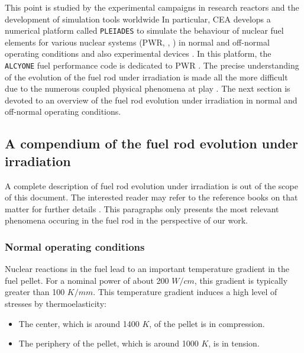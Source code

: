 This point is studied by the experimental campaigns in research reactors
and the development of simulation tools worldwide
\cite{ garcia_mono-dimensional_2002, williamson_multidimensional_2012, di_marcello_transuranus_2014, largenton_cyrano3_2014, petry_cyrano3_2015, qi_qualification_2019, scolaro_offbeat_2020}
In particular, CEA develops a numerical platform called \texttt{PLEIADES}
\cite{marelle_new_2016}
to simulate the behaviour of nuclear fuel elements
for various nuclear systems (PWR, \footnotemark[1], \footnotemark[2]) in normal and
off-normal operating conditions and also experimental devices
\cite{marelle_new_2016, lainet_recent_2013, helfer_licos_2015}.
In this platform, the \texttt{ALCYONE} fuel performance code is dedicated to PWR
\cite{helfer_recent_2015, marelle_new_2016, guenot-delahaie_simulation_2017}.
The precise understanding of the evolution of the fuel rod under
irradiation is made all the more difficult due to the numerous coupled
physical phenomena at play \cite{van_uffelen_3.19_2012}. The next section is
devoted to an overview of the fuel rod evolution under irradiation in
normal and off-normal operating conditions.

\subsection{A compendium of the fuel rod evolution under irradiation}

A complete description of fuel rod evolution under irradiation is out of
the scope of this document. The interested reader may refer to the
reference books on that matter for further details
\cite{bailly_nuclear_1999, cea_nuclear_2009}. This paragraphs only presents
the most relevant phenomena occuring in the fuel rod in the perspective
of our work.

\subsubsection{Normal operating conditions}
\label{sec_normal_operating_conditions}

Nuclear reactions in the fuel lead to an important temperature gradient
in the fuel pellet. For a nominal power of about 200 $W/cm$,
this gradient is typically greater than 100 $K/mm$. This
temperature gradient induces a high level of stresses by
thermoelasticity:

\begin{itemize}
    \item The center, which is around 1400 $K$, of the pellet is in
    compression.
    \item The periphery of the pellet, which is around 1000 $K$, is in
    tension.
\end{itemize}

